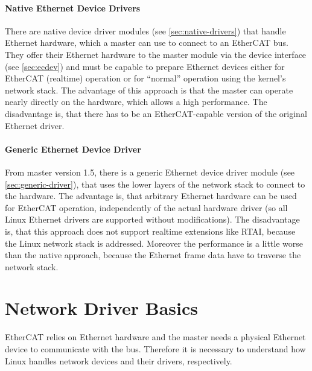 \documentclass[a4paper,12pt,BCOR6mm,bibtotoc,idxtotoc]{scrbook}
\begin{document}
\paragraph{Native Ethernet Device Drivers} There are native device driver
modules (see \autoref{sec:native-drivers}) that handle Ethernet hardware,
which a master can use to connect to an EtherCAT bus. They offer their
Ethernet hardware to the master module via the device interface (see
\autoref{sec:ecdev}) and must be capable to prepare Ethernet devices either
for EtherCAT (realtime) operation or for ``normal'' operation using the
kernel's network stack. The advantage of this approach is that the master can
operate nearly directly on the hardware, which allows a high performance. The
disadvantage is, that there has to be an EtherCAT-capable version of the
original Ethernet driver.

\paragraph{Generic Ethernet Device Driver} From master version 1.5, there is a
generic Ethernet device driver module (see \autoref{sec:generic-driver}),
that uses the lower layers of the network stack to connect to the hardware.
The advantage is, that arbitrary Ethernet hardware can be used for EtherCAT
operation, independently of the actual hardware driver (so all Linux Ethernet
drivers are supported without modifications). The disadvantage is, that this
approach does not support realtime extensions like RTAI, because the Linux
network stack is addressed. Moreover the performance is a little worse than
the native approach, because the Ethernet frame data have to traverse the
network stack.


\section{Network Driver Basics}
\label{sec:networkdrivers}

EtherCAT relies on Ethernet hardware and the master needs a physical
Ethernet device to communicate with the bus. Therefore it is necessary
to understand how Linux handles network devices and their drivers,
respectively.
\end{document}

